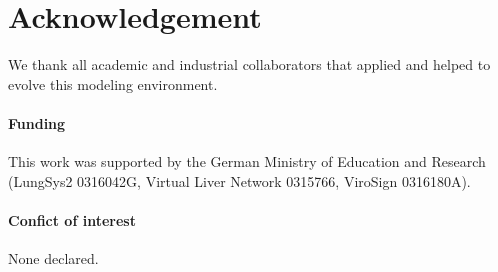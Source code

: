 \documentclass{bioinfo}
\begin{document}
\section*{Acknowledgement}
We thank all academic and industrial collaborators that applied 
and helped to evolve this modeling environment.

\paragraph{Funding\textcolon} 
This work was supported by the German Ministry of Education and Research (LungSys2 
0316042G, Virtual Liver Network 0315766, ViroSign 0316180A).

\paragraph{Confict of interest\textcolon} None declared.



\end{document}
